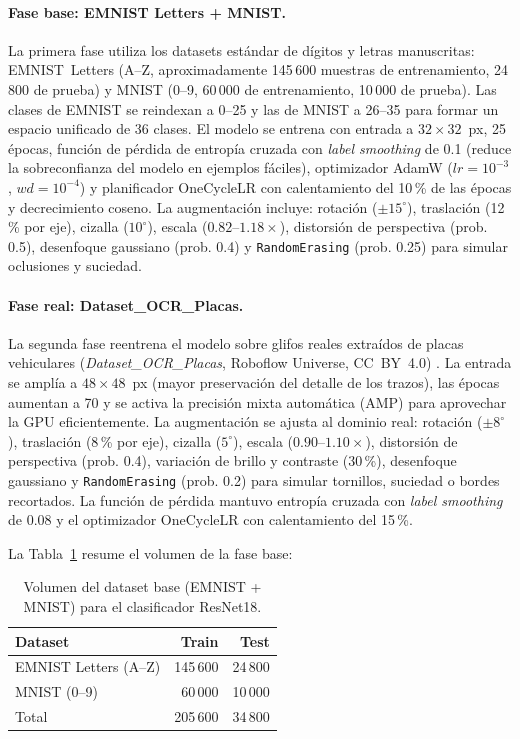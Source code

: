 \documentclass[11pt]{article}
\begin{document}
\paragraph{Fase base: EMNIST Letters + MNIST.}
La primera fase utiliza los datasets estándar de dígitos y letras manuscritas:
EMNIST~Letters (A--Z, aproximadamente 145\,600 muestras de entrenamiento, 24\,800 de
prueba) y MNIST (0--9, 60\,000 de entrenamiento, 10\,000 de prueba). Las clases de
EMNIST se reindexan a 0--25 y las de MNIST a 26--35 para formar un espacio unificado
de 36 clases. El modelo se entrena con entrada a $32\times32$~px, 25 épocas, función
de pérdida de entropía cruzada con \emph{label smoothing} de 0.1 (reduce la
sobreconfianza del modelo en ejemplos fáciles), optimizador AdamW
($lr{=}10^{-3}$, $wd{=}10^{-4}$) y planificador OneCycleLR con calentamiento del 10\,\%
de las épocas y decrecimiento coseno. La augmentación incluye: rotación ($\pm15^\circ$),
traslación (12\,\% por eje), cizalla ($10^\circ$), escala ($0.82$--$1.18\times$),
distorsión de perspectiva (prob. 0.5), desenfoque gaussiano (prob. 0.4) y
\texttt{RandomErasing} (prob. 0.25) para simular oclusiones y suciedad.

\paragraph{Fase real: Dataset\_OCR\_Placas.}
La segunda fase reentrena el modelo sobre glifos reales extraídos de placas vehiculares
(\emph{Dataset\_OCR\_Placas}, Roboflow Universe, CC~BY~4.0) \cite{ds_ocr_real}. La
entrada se amplía a $48\times48$~px (mayor preservación del detalle de los trazos), las
épocas aumentan a 70 y se activa la precisión mixta automática (AMP) para aprovechar
la GPU eficientemente. La augmentación se ajusta al dominio real: rotación ($\pm8^\circ$),
traslación (8\,\% por eje), cizalla ($5^\circ$), escala ($0.90$--$1.10\times$), distorsión
de perspectiva (prob. 0.4), variación de brillo y contraste (30\,\%), desenfoque
gaussiano y \texttt{RandomErasing} (prob. 0.2) para simular tornillos, suciedad o
bordes recortados. La función de pérdida mantuvo entropía cruzada con \emph{label
smoothing} de 0.08 y el optimizador OneCycleLR con calentamiento del 15\,\%.

La Tabla~\ref{tab:ds_cnn} resume el volumen de la fase base:

\begin{table}[H]
    \centering
    \caption{Volumen del dataset base (EMNIST + MNIST) para el clasificador ResNet18.}
    \label{tab:ds_cnn}
    \begin{tabular}{lrr}
        \toprule
        \textbf{Dataset} & \textbf{Train} & \textbf{Test} \\
        \midrule
        EMNIST Letters (A--Z) & 145\,600 & 24\,800 \\
        MNIST (0--9)          &  60\,000 & 10\,000 \\
        \midrule
        Total                 & 205\,600 & 34\,800 \\
        \bottomrule
    \end{tabular}
\end{table}
\end{document}
